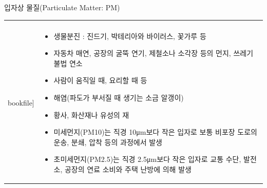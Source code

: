 \begin{frame}[t]{입자상 물질(Particulate Matter: PM)}
	\begin{tabular}{ll}
		\begin{minipage}[t]{0.4\textwidth}\scriptsize
			\begin{figure}[t]
				\texttt{[image: \\bookfile]}
			\end{figure}
		\end{minipage}	
		&
		\begin{minipage}[t]{0.55\textwidth} \scriptsize	
			\begin{itemize}
				\item 생물분진 : 진드기, 박테리아와 바이러스, 꽃가루 등
				\item 자동차 매연, 공장의 굴뚝 연기, 제철소나 소각장 등의 먼지, 쓰레기 불법 연소
				\item 사람이 움직일 때, 요리할 때 등
				\item 해염(파도가 부서질 때 생기는 소금 알갱이)
				\item 황사, 화산재나 유성의 재
				
				\item 미세먼지(PM10)는 직경 10μm보다 작은 입자로 보통 비포장 도로의 운송, 분쇄, 압착 등의 과정에서 발생
				\item 초미세먼지(PM2.5)는 직경 2.5μm보다 작은 입자로 교통 수단, 발전소, 공장의 연료 소비와 주택 난방에 의해 발생
									
			\end{itemize}

		\end{minipage}
	\end{tabular}
\end{frame}



